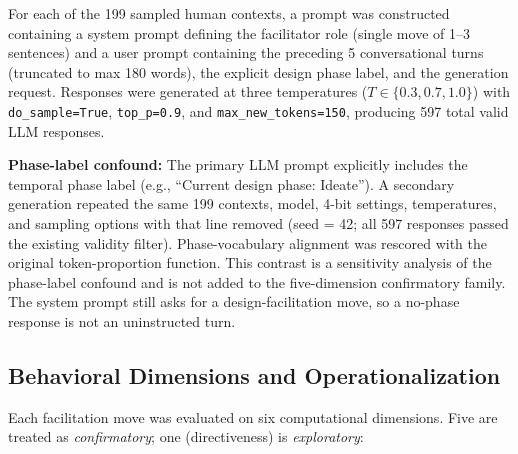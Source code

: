 \documentclass[10pt,journal,compsoc]{IEEEtran}
\begin{document}
For each of the 199 sampled human contexts, a prompt was constructed containing a system prompt defining the facilitator role (single move of 1--3 sentences) and a user prompt containing the preceding 5 conversational turns (truncated to max 180 words), the explicit design phase label, and the generation request. Responses were generated at three temperatures ($T \in \{0.3, 0.7, 1.0\}$) with \texttt{do\_sample=True}, \texttt{top\_p=0.9}, and \texttt{max\_new\_tokens=150}, producing 597 total valid LLM responses.

\textbf{Phase-label confound:} The primary LLM prompt explicitly includes the temporal phase label (e.g., ``Current design phase: Ideate''). A secondary generation repeated the same 199 contexts, model, 4-bit settings, temperatures, and sampling options with that line removed (seed = 42; all 597 responses passed the existing validity filter). Phase-vocabulary alignment was rescored with the original token-proportion function. This contrast is a sensitivity analysis of the phase-label confound and is not added to the five-dimension confirmatory family. The system prompt still asks for a design-facilitation move, so a no-phase response is not an uninstructed turn.

\subsection{Behavioral Dimensions and Operationalization}
Each facilitation move was evaluated on six computational dimensions. Five are treated as \emph{confirmatory}; one (directiveness) is \emph{exploratory}:
\end{document}
